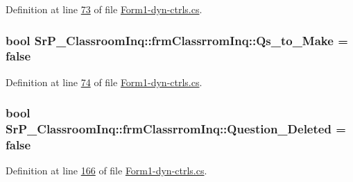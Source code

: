 \-Definition at line \hyperlink{_form1-dyn-ctrls_8cs_source_l00073}{73} of file \hyperlink{_form1-dyn-ctrls_8cs_source}{\-Form1-\/dyn-\/ctrls.\-cs}.

\hypertarget{class_sr_p___classroom_inq_1_1frm_classrrom_inq_a74b0b2afc18cdf1d19dc415ab870e68b}{
\subsubsection[{\-Qs\-\_\-to\-\_\-\-Make}]{\setlength{\rightskip}{0pt plus 5cm}bool {\bf \-Sr\-P\-\_\-\-Classroom\-Inq\-::frm\-Classrrom\-Inq\-::\-Qs\-\_\-to\-\_\-\-Make} = false}}
\label{class_sr_p___classroom_inq_1_1frm_classrrom_inq_a74b0b2afc18cdf1d19dc415ab870e68b}


\-Definition at line \hyperlink{_form1-dyn-ctrls_8cs_source_l00074}{74} of file \hyperlink{_form1-dyn-ctrls_8cs_source}{\-Form1-\/dyn-\/ctrls.\-cs}.

\hypertarget{class_sr_p___classroom_inq_1_1frm_classrrom_inq_a8f54ae3a0ea7bb9dafed984a53155fd8}{
\subsubsection[{\-Question\-\_\-\-Deleted}]{\setlength{\rightskip}{0pt plus 5cm}bool {\bf \-Sr\-P\-\_\-\-Classroom\-Inq\-::frm\-Classrrom\-Inq\-::\-Question\-\_\-\-Deleted} = false}}
\label{class_sr_p___classroom_inq_1_1frm_classrrom_inq_a8f54ae3a0ea7bb9dafed984a53155fd8}


\-Definition at line \hyperlink{_form1-dyn-ctrls_8cs_source_l00166}{166} of file \hyperlink{_form1-dyn-ctrls_8cs_source}{\-Form1-\/dyn-\/ctrls.\-cs}.

